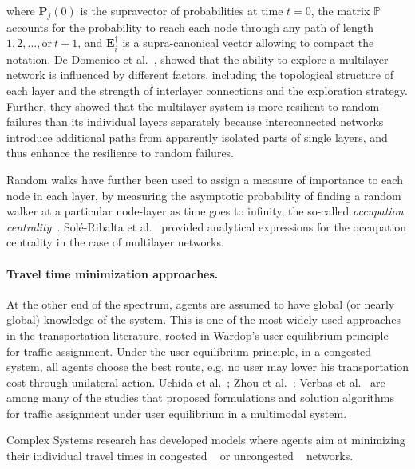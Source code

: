 where $\mathbf{P}_j(0)$ is the supravector of probabilities at time $t=0$, the matrix $\mathbb{P}$ accounts for the probability to reach each node through any path of length $1, 2, \dots, \text{or}\ t+1$, and $\mathbf{E}_i^{\dagger}$ is a supra-canonical vector allowing to compact the notation. De Domenico et al.~\cite{dedomenico2014interconnected}, showed that the ability to explore a multilayer network is influenced by different factors, including the topological structure of each layer and the strength of interlayer connections and the exploration strategy. Further, they showed that the multilayer system is more resilient to random failures than its individual layers separately because interconnected networks introduce additional paths from apparently isolated parts of single layers, and thus enhance the resilience to random failures.

Random walks have further been used to assign a measure of importance to each node in each layer, by measuring the asymptotic probability of finding a random walker at a particular node-layer as time goes to infinity, the so-called \emph{occupation centrality}~\cite{sole2016random}. Sol\'{e}-Ribalta et al.~\cite{sole2016random} provided analytical expressions for the occupation centrality in the case of multilayer networks.

\paragraph{Travel time minimization approaches.}
At the other end of the spectrum, agents are assumed to have global (or nearly global) knowledge of the system. This is one of the most widely-used approaches in the transportation literature, rooted in Wardop’s user equilibrium principle~\cite{wardrop1952road} for traffic assignment. Under the user equilibrium principle, in a congested system, all agents choose the best route, e.g. no user may lower his transportation cost through unilateral action. Uchida et al.~\cite{uchida2005study}; Zhou et al.~\cite{zhou2008dynamic}; Verbas et al.~\cite{verbas2015dynamic} are among many of the studies that proposed formulations and solution algorithms for traffic assignment under user equilibrium in a multimodal system.

Complex Systems research has developed models where agents aim at minimizing their individual travel times in congested ~\cite{tan2014congestion,bassolas2020scaling,manfredi2018congestion,sole-ribalta2016congestion} or uncongested ~\cite{du2014traffic,du2016physics} networks. 

